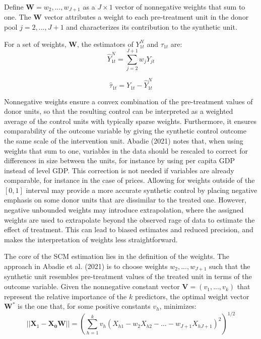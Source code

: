 \documentclass[12pt,a4paper,draft]{article}
\begin{document}
Define $\mathbf{W}=w_2,...,w_{J+1}$ as a $J\times 1$ vector of nonnegative weights
that sum to one. 
The $\mathbf{W}$ vector attributes a weight to each pre-treatment unit in the donor pool 
$j=2,...,J+1$ and characterizes its contribution to the synthetic unit. 

For a set of weights, $\mathbf{W}$, the estimators of $Y_{1t}^N$ and $\tau_{1t}$ are:
\begin{equation}
    \hat{Y}_{1t}^N = \sum_{j=2}^{J+1} {w_jY_{jt}}
\end{equation}

\begin{equation}
    \hat{\tau}_{1t}=Y_{1t}- \hat{Y}_{1t}^N
\end{equation}


Nonnegative weights ensure a convex combination of the pre-treatment values of donor 
units, so that the resulting control can be interpreted as a weighted average 
of the control units with typically sparse weights. 
Furthermore, it ensures comparability of the outcome variable by giving the 
synthetic control outcome the same scale of the intervention unit. 
Abadie (2021) notes that, when using weights that sum to one, variables in the data 
should be rescaled to correct for differences in size between the units, for 
instance by using per capita GDP instead of level GDP. This correction is not 
needed if variables are already comparable, for instance in the case of prices.
Allowing for weights outside of the $[0,1]$ interval may provide a more 
accurate synthetic control by placing negative emphasis on some donor units that 
are dissimilar to the treated one. However, negative unbounded weights may 
introduce extrapolation, where the assigned weights are used to extrapolate 
beyond the observed rage of data to estimate the effect of treatment. 
This can lead to biased estimates and reduced precision, and makes the interpretation 
of weights less straightforward. 

The core of the SCM estimation lies in the definition of the weights. 
The approach in Abadie et al. (2021) is to choose weights $w_2,...,w_{J+1}$ such that 
the synthetic unit resembles pre-treatment values of the treated unit in terms 
of the outcome variable.
Given the nonnegative constant vector $\mathbf{V}=(v_1,...,v_k)$ 
that represent the relative importance of the $k$ predictors, the optimal 
weight vector $\mathbf{W}^*$ is the one that, for some positive constants $v_h$, minimizes:
\begin{equation}
    || \mathbf{X}_1 - \mathbf{X_0} \mathbf{W} || = 
\left( \sum_{h=1}^k {v_h \left( X_{h1}-w_2 X_{h2}-\ldots - w_{J+1} 
X_{hJ+1} \right) ^2} \right)^{1/2}
\end{equation}
\end{document}
